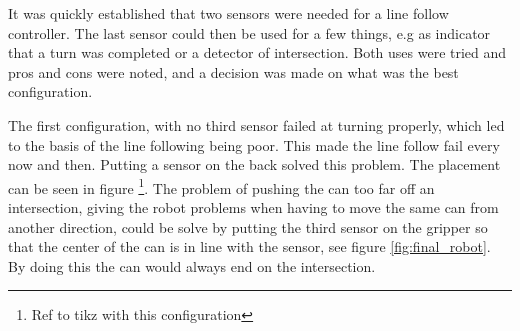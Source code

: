 It was quickly established that two sensors were needed for a line follow controller. The last sensor could then be used for a few things, e.g as indicator that a turn was completed or a detector of intersection. Both uses were tried and pros and cons were noted, and a decision was made on what was the best configuration.


The first configuration, with no third sensor failed at turning properly, which led to the basis of the line following being poor. This made the line follow fail every now and then. Putting a sensor on the back solved this problem. The placement can be seen in figure \footnote{Ref to tikz with this configuration}. The problem of pushing the can too far off an intersection, giving the robot problems when having to move the same can from another direction, could be solve by putting the third sensor on the gripper so that the center of the can is in line with the sensor, see figure \ref{fig:final_robot}. By doing this the can would always end on the intersection. 

